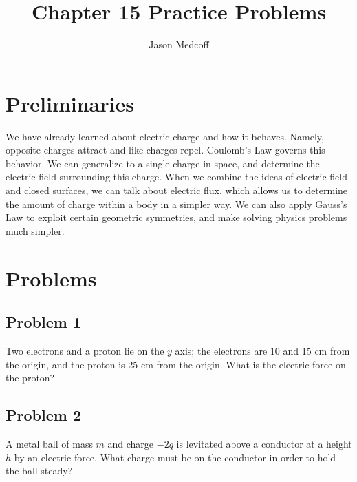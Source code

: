 \documentclass{article}
\title{Chapter 15 Practice Problems}
\author{Jason Medcoff}
\date{}
\begin{document}
	
	\maketitle
	
	\section{Preliminaries}
	
	We have already learned about electric charge and how it behaves. Namely, opposite charges attract and like charges repel. Coulomb's Law governs this behavior. We can generalize to a single charge in space, and determine the electric field surrounding this charge.
	When we combine the ideas of electric field and closed surfaces, we can talk about electric flux, which allows us to determine the amount of charge within a body in a simpler way. We can also apply Gauss's Law to exploit certain geometric symmetries, and make solving physics problems much simpler.
	
	\section{Problems}
	
	\subsection{Problem 1}
	
	Two electrons and a proton lie on the $y$ axis; the electrons are 10 and 15 cm from the origin, and the proton is 25 cm from the origin. What is the electric force on the proton?
	\newline \newline \newline \newline \newline 
    \newline \newline \newline \newline \newline 
	\subsection{Problem 2}
	
	A metal ball of mass $m$ and charge $-2q$ is levitated above a conductor at a height $h$ by an electric force. What charge must be on the conductor in order to hold the ball steady?
    \newline \newline \newline \newline \newline 
    \newline \newline \newline \newline \newline 
	
\end{document}
